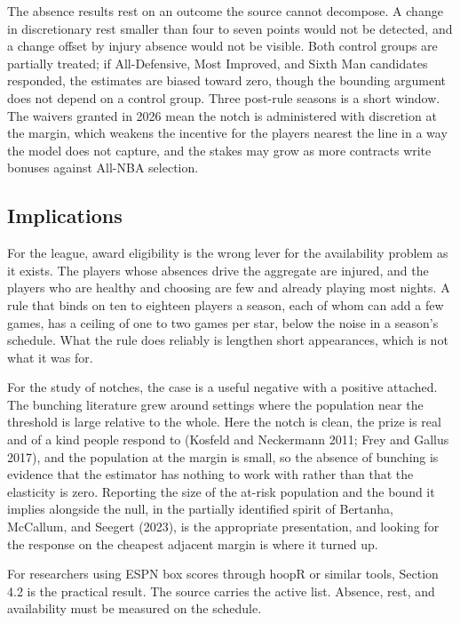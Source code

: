 \documentclass[11pt]{article}
\begin{document}
The absence results rest on an outcome the source cannot decompose. A change in discretionary rest smaller than four to seven points would not be detected, and a change offset by injury absence would not be visible. Both control groups are partially treated; if All-Defensive, Most Improved, and Sixth Man candidates responded, the estimates are biased toward zero, though the bounding argument does not depend on a control group. Three post-rule seasons is a short window. The waivers granted in 2026 mean the notch is administered with discretion at the margin, which weakens the incentive for the players nearest the line in a way the model does not capture, and the stakes may grow as more contracts write bonuses against All-NBA selection.


\subsection*{Implications}


For the league, award eligibility is the wrong lever for the availability problem as it exists. The players whose absences drive the aggregate are injured, and the players who are healthy and choosing are few and already playing most nights. A rule that binds on ten to eighteen players a season, each of whom can add a few games, has a ceiling of one to two games per star, below the noise in a season's schedule. What the rule does reliably is lengthen short appearances, which is not what it was for.

For the study of notches, the case is a useful negative with a positive attached. The bunching literature grew around settings where the population near the threshold is large relative to the whole. Here the notch is clean, the prize is real and of a kind people respond to (Kosfeld and Neckermann 2011; Frey and Gallus 2017), and the population at the margin is small, so the absence of bunching is evidence that the estimator has nothing to work with rather than that the elasticity is zero. Reporting the size of the at-risk population and the bound it implies alongside the null, in the partially identified spirit of Bertanha, McCallum, and Seegert (2023), is the appropriate presentation, and looking for the response on the cheapest adjacent margin is where it turned up.

For researchers using ESPN box scores through hoopR or similar tools, Section 4.2 is the practical result. The source carries the active list. Absence, rest, and availability must be measured on the schedule.
\end{document}
